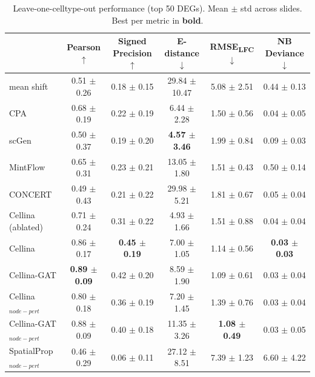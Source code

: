 \begin{table}[t]
\centering
\caption{Leave-one-celltype-out performance (top 50 DEGs). Mean $\pm$ std across slides. Best per metric in \textbf{bold}.}
\label{tab:loo_summary_crc}
\begin{tabular}{lccccc}
\toprule
 & Pearson $\uparrow$ & Signed Precision $\uparrow$ & E-distance $\downarrow$ & RMSE\textsubscript{LFC} $\downarrow$ & NB Deviance $\downarrow$ \\
\midrule
mean shift & 0.51 $\pm$ 0.26 & 0.18 $\pm$ 0.15 & 29.84 $\pm$ 10.47 & 5.08 $\pm$ 2.51 & 0.44 $\pm$ 0.13 \\
CPA & 0.68 $\pm$ 0.19 & 0.22 $\pm$ 0.19 & 6.44 $\pm$ 2.28 & 1.50 $\pm$ 0.56 & 0.04 $\pm$ 0.05 \\
scGen & 0.50 $\pm$ 0.37 & 0.19 $\pm$ 0.20 & \textbf{4.57 $\pm$ 3.46} & 1.99 $\pm$ 0.84 & 0.09 $\pm$ 0.03 \\
MintFlow & 0.65 $\pm$ 0.31 & 0.23 $\pm$ 0.21 & 13.05 $\pm$ 1.80 & 1.51 $\pm$ 0.43 & 0.50 $\pm$ 0.14 \\
CONCERT & 0.49 $\pm$ 0.43 & 0.21 $\pm$ 0.22 & 29.98 $\pm$ 5.21 & 1.81 $\pm$ 0.67 & 0.05 $\pm$ 0.04 \\
Cellina (ablated) & 0.71 $\pm$ 0.24 & 0.31 $\pm$ 0.22 & 4.93 $\pm$ 1.66 & 1.51 $\pm$ 0.88 & 0.04 $\pm$ 0.04 \\
Cellina & 0.86 $\pm$ 0.17 & \textbf{0.45 $\pm$ 0.19} & 7.00 $\pm$ 1.05 & 1.14 $\pm$ 0.56 & \textbf{0.03 $\pm$ 0.03} \\
Cellina-GAT & \textbf{0.89 $\pm$ 0.09} & 0.42 $\pm$ 0.20 & 8.59 $\pm$ 1.90 & 1.09 $\pm$ 0.61 & 0.03 $\pm$ 0.04 \\
Cellina$_{node-pert}$ & 0.80 $\pm$ 0.18 & 0.36 $\pm$ 0.19 & 7.20 $\pm$ 1.45 & 1.39 $\pm$ 0.76 & 0.03 $\pm$ 0.04 \\
Cellina-GAT$_{node-pert}$ & 0.88 $\pm$ 0.09 & 0.40 $\pm$ 0.18 & 11.35 $\pm$ 3.26 & \textbf{1.08 $\pm$ 0.49} & 0.03 $\pm$ 0.05 \\
SpatialProp$_{node-pert}$ & 0.46 $\pm$ 0.29 & 0.06 $\pm$ 0.11 & 27.12 $\pm$ 8.51 & 7.39 $\pm$ 1.23 & 6.60 $\pm$ 4.22 \\
\bottomrule
\end{tabular}
\end{table}
